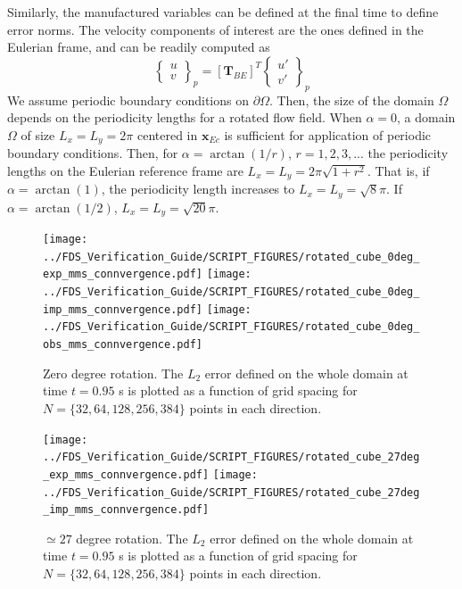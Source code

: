 \documentclass[11pt]{book}
\begin{document}
Similarly, the manufactured variables can be defined at the final time to define error norms. The velocity components of interest are the ones defined in the Eulerian frame, and can be readily computed as
%
\begin{equation}
  \left\{ \begin{array}{c}  u \\ v \end{array} \right\}_p = [\mathbf{T}_{BE}]^T \left\{ \begin{array}{c}  u' \\ v' \end{array} \right\}_p
\end{equation}
%
We assume periodic boundary conditions on $\partial \Omega$. Then, the size of the domain $\Omega$ depends on the periodicity lengths for a rotated flow field.
When $\alpha=0$, a domain $\Omega$ of size $L_x=L_y=2\pi$ centered in $\mathbf{x}_{Ec}$ is sufficient for application of periodic boundary conditions. Then, for $\alpha=\arctan(1/r)$, $r=1,2,3,...$ the periodicity lengths on the Eulerian reference frame are $L_x=L_y=2\pi \sqrt{1+r^2}$.
That is, if $\alpha=\arctan(1)$,  the periodicity length increases to $L_x=L_y=\sqrt{8} \pi$. If $\alpha=\arctan(1/2)$, $L_x=L_y=\sqrt{20} \pi$.



\begin{figure}[ht]
\centering
\texttt{[image: ../FDS\_Verification\_Guide/SCRIPT\_FIGURES/rotated\_cube\_0deg\_exp\_mms\_connvergence.pdf]}
\texttt{[image: ../FDS\_Verification\_Guide/SCRIPT\_FIGURES/rotated\_cube\_0deg\_imp\_mms\_connvergence.pdf]}
\texttt{[image: ../FDS\_Verification\_Guide/SCRIPT\_FIGURES/rotated\_cube\_0deg\_obs\_mms\_connvergence.pdf]}
\caption[The {\ct Rotated Cube CC} accuracy order test case]{Zero degree rotation. The $L_2$ error defined on the whole domain at time $t = 0.95$ s is plotted as a function of grid spacing for $N=\{32,64,128,256,384\}$ points in each direction.}\label{fig:rotcube_cc_0deg_accuracy_order}
\end{figure}


\begin{figure}[ht]
\centering
\texttt{[image: ../FDS\_Verification\_Guide/SCRIPT\_FIGURES/rotated\_cube\_27deg\_exp\_mms\_connvergence.pdf]}
\texttt{[image: ../FDS\_Verification\_Guide/SCRIPT\_FIGURES/rotated\_cube\_27deg\_imp\_mms\_connvergence.pdf]}
\caption[The {\ct Rotated Cube CC} accuracy order test case]{$\simeq27$ degree rotation. The $L_2$ error defined on the whole domain at time $t = 0.95$ s is plotted as a function of grid spacing for $N=\{32,64,128,256,384\}$ points in each direction.}\label{fig:rotcube_cc_27deg_accuracy_order}
\end{figure}
\end{document}
